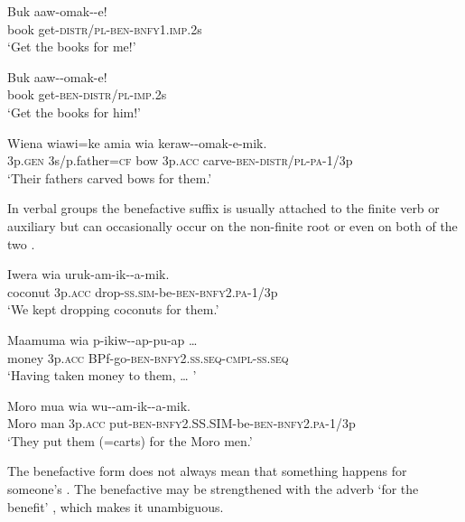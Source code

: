 \ea%
\label{ex:3:x1925}
\gll Buk aaw-omak--e! \\
book get-\textsc{distr}/\textsc{pl}-\textsc{ben}-\textsc{bnfy}1.\textsc{imp}.2s\\
\glt`Get the books for me!'
\z

\ea%
\label{ex:3:x211}
\gll Buk aaw--omak-e! \\
book get-\textsc{ben}-\textsc{distr}/\textsc{pl}-\textsc{imp}.2s \\
\glt`Get the books for him!'
\z

\ea%
\label{ex:3:x1926}
\gll Wiena wiawi=ke amia wia keraw--omak-e-mik. \\
3p.\textsc{gen} 3s/p.father=\textsc{cf} bow 3p.\textsc{acc} carve-\textsc{ben}-\textsc{distr}/\textsc{pl}-\textsc{pa}-1/3p \\
\glt`Their fathers carved bows for them.'
\z

In verbal groups the benefactive suffix is usually attached to the finite verb or auxiliary  but can occasionally occur on the non-finite root  or even on both of the two .

\ea%
\label{ex:3:x212}
\gll Iwera wia uruk-am-ik--a-mik. \\
coconut 3p.\textsc{acc} drop-\textsc{ss}.\textsc{sim}-be-\textsc{ben}-\textsc{bnfy}2.\textsc{pa}-1/3p\\
\glt`We kept dropping coconuts for them.' 
\z

\ea%
\label{ex:3:x213}
\gll Maamuma wia p-ikiw--ap-pu-ap {\dots} \\
money 3p.\textsc{acc} BPf-go-\textsc{ben}-\textsc{bnfy}2.\textsc{ss}.\textsc{seq}-\textsc{cmpl}-\textsc{ss}.\textsc{seq} \\
\glt`Having taken money to them, {\dots} '
\z

\ea%
\label{ex:3:x214}
\gll Moro mua wia wu--am-ik--a-mik. \\
Moro man 3p.\textsc{acc} put-\textsc{ben}-\textsc{bnfy}2.SS.SIM-be-\textsc{ben}-\textsc{bnfy}2.\textsc{pa}-1/3p\\
\glt`They put them (=carts) for the Moro men.' 
\z

The benefactive form does not always mean that something happens for someone's\textstyleEmphasizedWords{} . The benefactive may be strengthened with the adverb  `for the benefit' , which makes it unambiguous.

